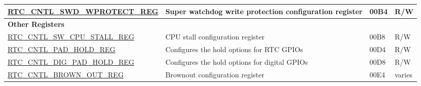 \begin{longtable}{ | p{6.5cm} | p{6.8cm} | p{1.3cm} | p{1cm} | }
\hyperref[regdesc:RTCCNTLSWDWPROTECTREG]{RTC\_CNTL\_SWD\_WPROTECT\_REG} & Super watchdog write protection configuration register & \hexprefix{}00B4 & R/W \\ \hline
\multicolumn{4}{|l|}{\textbf{Other Registers}} \\ \hline
\hyperref[regdesc:RTCCNTLSWCPUSTALLREG]{RTC\_CNTL\_SW\_CPU\_STALL\_REG} & CPU stall configuration register & \hexprefix{}00B8 & R/W \\ \hline
\hyperref[regdesc:RTCCNTLPADHOLDREG]{RTC\_CNTL\_PAD\_HOLD\_REG} & Configures the hold options for RTC GPIOs & \hexprefix{}00D4 & R/W \\ \hline
\hyperref[regdesc:RTCCNTLDIGPADHOLDREG]{RTC\_CNTL\_DIG\_PAD\_HOLD\_REG} & Configures the hold options for digital GPIOs & \hexprefix{}00D8 & R/W \\ \hline
\hyperref[regdesc:RTCCNTLBROWNOUTREG]{RTC\_CNTL\_BROWN\_OUT\_REG} & Brownout configuration register & \hexprefix{}00E4 & varies \\ \hline
\end{longtable}
